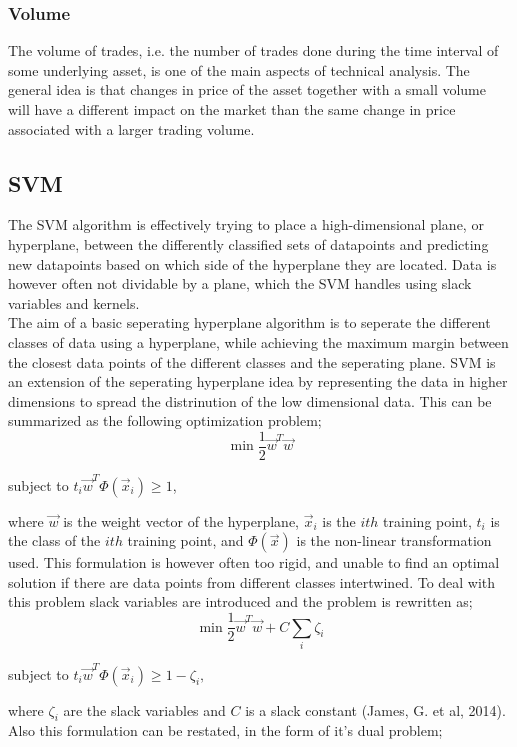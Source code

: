 \documentclass{article}
\begin{document}
\subsubsection{Volume}
The volume of trades, i.e. the number of trades done during the time interval of some underlying asset, is one of the main aspects of technical analysis. The general idea is that changes in price of the asset together with a small volume will have a different impact on the market than the same change in price associated with a larger trading volume. 

\subsection{SVM}
The SVM algorithm is effectively trying to place a high-dimensional plane, or hyperplane, between the differently classified sets of datapoints and predicting new datapoints based on which side of the hyperplane they are located. Data is however often not dividable by a plane, which the SVM handles using slack variables and kernels. \\
The aim of a basic seperating hyperplane algorithm is to seperate the different classes of data using a hyperplane, while achieving the maximum margin between the closest data points of the different classes and the seperating plane. SVM is an extension of the seperating hyperplane idea by representing the data in higher dimensions to spread the distrinution of the low dimensional data. This can be summarized as the following optimization problem;
\begin{equation}
\min \frac{1}{2}\vec{w}^{T}\vec{w}
\end{equation} 
\begin{center}
 subject to  $t_i \vec{w}^{T} \Phi(\vec{x}_i)  \geq 1$,  \\
\end{center}
where $\vec{w}$ is the weight vector of the hyperplane, $\vec{x}_i$ is the $ith$ training point, $t_i$ is the class of the $ith$ training point, and $\Phi(\vec{x})$ is the non-linear transformation used. This formulation is however often too rigid, and unable to find an optimal solution if there are data points from different classes intertwined. To deal with this problem slack variables are introduced and the problem is rewritten as; 
\begin{equation}
\min \frac{1}{2}\vec{w}^{T}\vec{w} + C\sum\limits_i \zeta_i 
\end{equation}
\begin{center}
subject to $t_i \vec{w}^{T} \Phi(\vec{x}_i)  \geq 1 - \zeta_i, $
\end{center}
where $\zeta_i$ are the slack variables and $C$ is a slack constant (James, G. et al, 2014). Also this formulation can be restated, in the form of it's dual problem;
\end{document}
